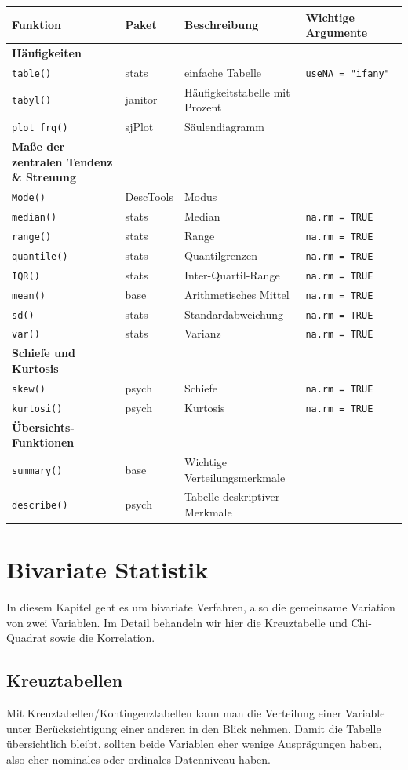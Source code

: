 \documentclass[
]{book}
\begin{document}
\begin{longtable}[]{@{}llll@{}}
\toprule
Funktion & Paket & Beschreibung & Wichtige Argumente\tabularnewline
\midrule
\endhead
\textbf{Häufigkeiten} & & &\tabularnewline
\texttt{table()} & stats & einfache Tabelle & \texttt{useNA\ =\ "ifany"}\tabularnewline
\texttt{tabyl()} & janitor & Häufigkeitstabelle mit Prozent &\tabularnewline
\texttt{plot\_frq()} & sjPlot & Säulendiagramm &\tabularnewline
\textbf{Maße der zentralen Tendenz \& Streuung} & & &\tabularnewline
\texttt{Mode()} & DescTools & Modus &\tabularnewline
\texttt{median()} & stats & Median & \texttt{na.rm\ =\ TRUE}\tabularnewline
\texttt{range()} & stats & Range & \texttt{na.rm\ =\ TRUE}\tabularnewline
\texttt{quantile()} & stats & Quantilgrenzen & \texttt{na.rm\ =\ TRUE}\tabularnewline
\texttt{IQR()} & stats & Inter-Quartil-Range & \texttt{na.rm\ =\ TRUE}\tabularnewline
\texttt{mean()} & base & Arithmetisches Mittel & \texttt{na.rm\ =\ TRUE}\tabularnewline
\texttt{sd()} & stats & Standardabweichung & \texttt{na.rm\ =\ TRUE}\tabularnewline
\texttt{var()} & stats & Varianz & \texttt{na.rm\ =\ TRUE}\tabularnewline
\textbf{Schiefe und Kurtosis} & & &\tabularnewline
\texttt{skew()} & psych & Schiefe & \texttt{na.rm\ =\ TRUE}\tabularnewline
\texttt{kurtosi()} & psych & Kurtosis & \texttt{na.rm\ =\ TRUE}\tabularnewline
\textbf{Übersichts-Funktionen} & & &\tabularnewline
\texttt{summary()} & base & Wichtige Verteilungsmerkmale &\tabularnewline
\texttt{describe()} & psych & Tabelle deskriptiver Merkmale &\tabularnewline
\bottomrule
\end{longtable}

\hypertarget{bivariate-statistik}{%
\chapter{Bivariate Statistik}\label{bivariate-statistik}}

In diesem Kapitel geht es um bivariate Verfahren, also die gemeinsame Variation von zwei Variablen. Im Detail behandeln wir hier die Kreuztabelle und Chi-Quadrat sowie die Korrelation.

\hypertarget{kreuztabellen}{%
\section{Kreuztabellen}\label{kreuztabellen}}

Mit Kreuztabellen/Kontingenztabellen kann man die Verteilung einer Variable unter Berücksichtigung einer anderen in den Blick nehmen. Damit die Tabelle übersichtlich bleibt, sollten beide Variablen eher wenige Ausprägungen haben, also eher nominales oder ordinales Datenniveau haben.
\end{document}

